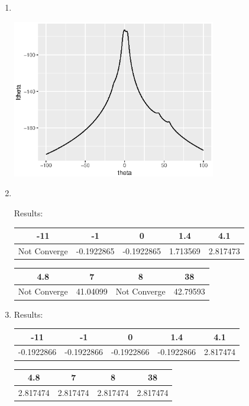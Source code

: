 \documentclass{article}
\begin{document}
\begin{enumerate}[leftmargin = 0 em, label = \arabic*., font = \bfseries]
\begin{enumerate}
	\item \ 

	

	\begin{center}
		\includegraphics[width = 0.7\textwidth]{ltheta.eps}
	\end{center}

	\item \ 

	

	Results:

		\begin{tabular}{*{5}{c}}
		\toprule
		-11& -1& 0& 1.4& 4.1\\
		\midrule
		 Not Converge & -0.1922865 & -0.1922865 & 1.713569 & 2.817473 \\
		 \bottomrule
		\end{tabular}

		\begin{tabular}{*{4}{c}}
		\toprule
		4.8& 7& 8& 38 \\
		\midrule
		Not Converge & 41.04099 & Not Converge & 42.79593\\
		\bottomrule
		\end{tabular}

	\item 
	Results:

		\begin{tabular}{*{5}{c}}
		\toprule
		-11& -1& 0& 1.4& 4.1\\
		\midrule
		 -0.1922866 & -0.1922866 & -0.1922866 & -0.1922866 &  2.817474 \\
		 \bottomrule
		\end{tabular}

		\begin{tabular}{*{4}{c}}
		\toprule
		4.8& 7& 8& 38 \\
		\midrule
		 2.817474 &  2.817474 & 2.817474 & 2.817474\\
		\bottomrule
		\end{tabular}


\end{enumerate}
\end{enumerate}
\end{document}
